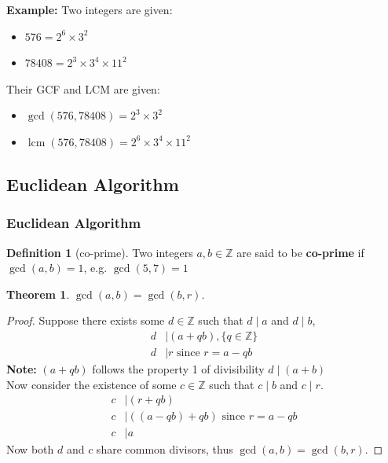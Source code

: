 \documentclass[12pt]{article}
\newcommand{\Z}{\mathbb{Z}}
\newtheorem{theorem}{Theorem}
\theoremstyle{definition}
\newtheorem{definition}{Definition}
\DeclareMathOperator{\lcm}{lcm}
\begin{document}
    \textbf{Example:} Two integers are given:
    \begin{itemize} 
        \item $576 = 2^6 \times 3^2$
        \item $78408 = 2^3 \times 3^4 \times 11^2$
    \end{itemize}
    Their GCF and LCM are given:
    \begin{itemize}
        \item $\gcd(576,78408) = 2^3 \times 3^2$
        \item $\lcm(576, 78408) = 2^6 \times 3^4 \times 11^2$
    \end{itemize}

    \subsection{Euclidean Algorithm}
    \subsubsection{Euclidean Algorithm}
    \begin{definition}[co-prime]
        \label{def:co-prime}
        Two integers $a,b \in \Z$ are said to be \textbf{co-prime} if $\gcd(a,b) = 1$,
        e.g. $\gcd(5,7) = 1$\\
    \end{definition}

    \begin{theorem}
        \label{thm:euclidean-algorithm}
        $\gcd(a,b) = \gcd(b, r)$. \\
    \end{theorem}
    \begin{proof}
        Suppose there exists some $d \in \Z$ such that $d \mid a$ and $d \mid b$,
        \begin{align*}
            d &\mid (a + qb), \{q \in \Z\} \\
            d &\mid r \text{ since $r = a - qb$}
        \end{align*}
        \textbf{Note:} $(a+qb)$ follows the property 1 of divisibility $d \mid (a + b)$\\
        Now consider the existence of some $c \in \Z$ such that $c \mid b$ and $c \mid r$.
        \begin{align*}
            c &\mid (r + qb) \\
            c &\mid ((a - qb) + qb) \text{ since $r = a-qb$}\\
            c &\mid a
        \end{align*}
        Now both $d$ and $c$ share common divisors, thus $\gcd(a,b) = \gcd(b,r)$.
    \end{proof}
\end{document}
